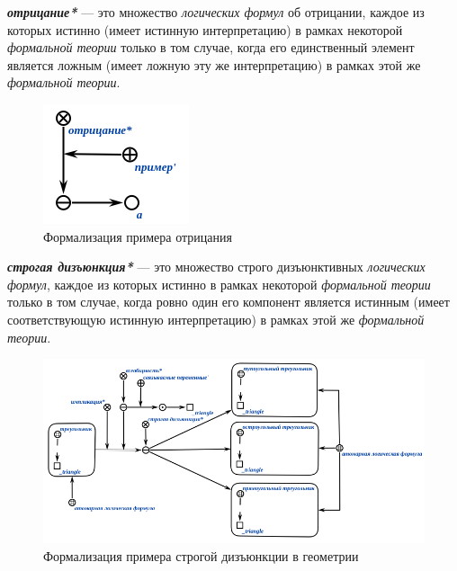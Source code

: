 \begin{SCn}
\end{SCn}

\textbf{\textit{отрицание*}} --- это множество \textit{логических формул} об отрицании, каждое из которых истинно (имеет истинную интерпретацию) в рамках некоторой \textit{формальной теории} только в том случае, когда его единственный элемент является ложным (имеет ложную эту же интерпретацию) в рамках этой же \textit{формальной теории}.

\begin{figure}[H]
	\includegraphics[scale=0.8]{author/part2/figures/logic/negation.png}
	\caption{Формализация примера отрицания}
	\label{fig:negation}
\end{figure}

\begin{SCn}
\end{SCn}

\textbf{\textit{строгая дизъюнкция*}} --- это множество строго дизъюнктивных \textit{логических формул}, каждое из которых истинно в рамках некоторой \textit{формальной теории} только в том случае, когда ровно один его компонент является истинным (имеет соответствующую истинную интерпретацию) в рамках этой же \textit{формальной теории}.

\begin{figure}[H]
	\includegraphics[scale=0.8]{author/part2/figures/logic/strict_disjunction_triangle.png}
	\caption{Формализация примера строгой дизъюнкции в геометрии}
	\label{fig:strict_disjunction_triangle}
\end{figure}

